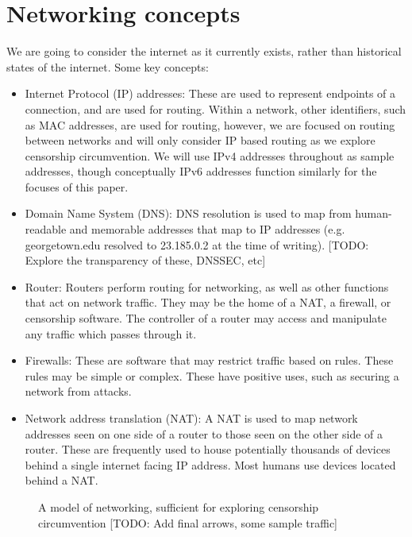 \documentclass[12pt]{report}
\begin{document}
\section{Networking concepts}
\label{networking}

We are going to consider the internet as it currently exists, rather than historical states of the internet. Some key concepts:

\begin{itemize}
  \item Internet Protocol (IP) addresses: These are used to represent endpoints of a connection, and are used for routing. Within a network, other identifiers, such as MAC addresses, are used for routing, however, we are focused on routing between networks and will only consider IP based routing as we explore censorship circumvention. We will use IPv4 addresses throughout as sample addresses, though conceptually IPv6 addresses function similarly for the focuses of this paper.
  \item Domain Name System (DNS): DNS resolution is used to map from human-readable and memorable addresses that map to IP addresses (e.g. georgetown.edu resolved to 23.185.0.2 at the time of writing). [TODO: Explore the transparency of these, DNSSEC, etc]
  \item Router: Routers perform routing for networking, as well as other functions that act on network traffic. They may be the home of a NAT, a firewall, or censorship software. The controller of a router may access and manipulate any traffic which passes through it.
  \item Firewalls: These are software that may restrict traffic based on rules. These rules may be simple or complex. These have positive uses, such as securing a network from attacks.
  \item Network address translation (NAT): A NAT is used to map network addresses seen on one side of a router to those seen on the other side of a router. These are frequently used to house potentially thousands of devices behind a single internet facing IP address. Most humans use devices located behind a NAT.
\end{itemize}

\begin{figure}
\begin{center}
{}
\end{center}
\caption[Basic networking]{A model of networking, sufficient for exploring censorship circumvention [TODO: Add final arrows, some sample traffic]}
\end{figure}
\end{document}
